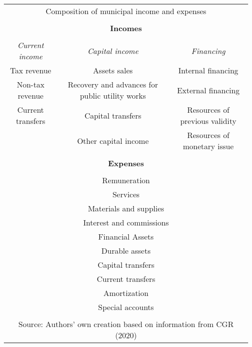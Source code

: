 \begin{table}[]
	\begin{tabular}{cll}
		\multicolumn{3}{c}{Composition of municipal income and expenses} \\
		\multicolumn{1}{l}{} &  &  \\ \hline
		\multicolumn{3}{|c|}{\textbf{Incomes}} \\ \hline
		\multicolumn{1}{l}{} &  &  \\ \hline
		\multicolumn{1}{|c|}{\textit{Current income}} & \multicolumn{1}{c|}{\textit{Capital income}} & \multicolumn{1}{c|}{\textit{Financing}} \\ \hline
		Tax revenue & \multicolumn{1}{c}{Assets sales} & \multicolumn{1}{c}{Internal financing} \\
		Non-tax revenue & \multicolumn{1}{c}{Recovery and advances for public utility works} & \multicolumn{1}{c}{External financing} \\
		Current transfers & \multicolumn{1}{c}{Capital transfers} & \multicolumn{1}{c}{Resources of previous validity} \\
		& \multicolumn{1}{c}{Other capital income} & \multicolumn{1}{c}{Resources of monetary issue} \\
		\multicolumn{1}{l}{} &  &  \\ \hline
		\multicolumn{3}{|c|}{\textbf{Expenses}} \\ \hline
		\multicolumn{1}{l}{} &  &  \\
		\multicolumn{3}{c}{Remuneration} \\
		\multicolumn{3}{c}{Services} \\
		\multicolumn{3}{c}{Materials and supplies} \\
		\multicolumn{3}{c}{Interest and commissions} \\
		\multicolumn{3}{c}{Financial Assets} \\
		\multicolumn{3}{c}{Durable assets} \\
		\multicolumn{3}{c}{Capital transfers} \\
		\multicolumn{3}{c}{Current transfers} \\
		\multicolumn{3}{c}{Amortization} \\
		\multicolumn{3}{c}{Special accounts} \\
		\multicolumn{1}{l}{} &  &  \\
		\multicolumn{3}{c}{Source: Authors' own creation based on information from CGR (2020)}
		
	\end{tabular}
\end{table}

